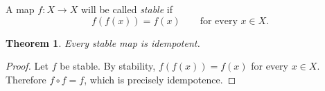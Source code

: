 \documentclass{article}
\newtheorem{theorem}{Theorem}
\begin{document}
A map $f:X\to X$ will be called \emph{stable} if
\[
  f(f(x))=f(x) \qquad\text{for every }x\in X.
\]

\begin{theorem}\label{thm:stable-idempotent}
Every stable map is idempotent.
\end{theorem}
\begin{proof}
Let $f$ be stable. By stability, $f(f(x))=f(x)$ for every $x\in X$.
Therefore $f\circ f=f$, which is precisely idempotence.
\end{proof}
\end{document}
